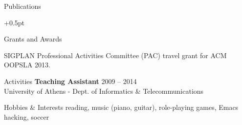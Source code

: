 \documentclass{resume}
\begin{document}

\begin{rSection}{Publications}
  \begin{rSubsection}{}{}{}{}
    \itemsep +0.5pt %
  \item {}
  \item {}
  \item {}
  \end{rSubsection}
\end{rSection}

\begin{rSection}{Grants and Awards}
  \begin{rSubsection}{}{}{}{}
  \item SIGPLAN Professional Activities Committee (PAC) travel grant
    for ACM OOPSLA 2013.
  \end{rSubsection}
\end{rSection}



\begin{rSection}{Activities}
  {\bf Teaching Assistant} \hfill {2009 -- 2014} \\
  University of Athens - Dept. of Informatics \& Telecommunications \\
\end{rSection}

\begin{rSection}{Hobbies \& Interests}
  reading, music (piano, guitar), role-playing games, Emacs hacking, soccer \\
\end{rSection}
\end{document}

